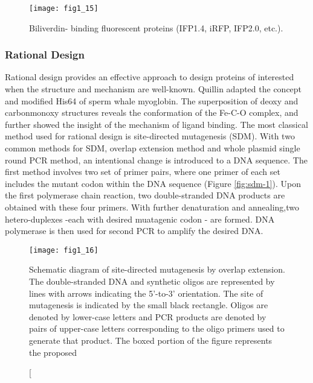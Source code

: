 \begin{refsection}
\begin{figure}[h!] \centering \texttt{[image: fig1\_15]}
    \caption[Biliverdin- binding fluorescent proteins (IFP1.4, iRFP, IFP2.0,
    etc.).]{Biliverdin- binding fluorescent proteins (IFP1.4, iRFP, IFP2.0,
        etc.)\cite{Kazlauskas2005}.} \label{fig:protein-engineering-example} 
\end{figure}

\subsubsection{Rational Design}
\label{sec:rational-design}

Rational design provides an effective approach to design proteins of interested
when the structure and mechanism are well-known. Quillin  adapted
the concept and modified His64 of sperm whale myoglobin. The superposition of
deoxy and carbonmonoxy structures reveals  the conformation of the Fe-C-O
complex, and further showed the insight of the mechanism of ligand
binding\cite{Quillin1993}. The most classical method used for rational design
is site-directed mutagenesis (SDM)\cite{Arnold1993}. With two common methods
for SDM, overlap extension method and whole plasmid single round PCR method, an
intentional change is introduced to a DNA sequence. The first method involves
two set of primer pairs, where one primer of each set includes the mutant codon
within the DNA sequence (Figure \ref{fig:sdm-1})\cite{Ho1989}. Upon the first
polymerase chain reaction, two double-stranded DNA products are obtained with
these four primers. With further denaturation and annealing,two hetero-duplexes
-each with desired muatagenic codon - are formed. DNA polymerase is then used
for second PCR to amplify the desired DNA\cite{Ho1989}. 
\begin{figure}[h!] \centering \texttt{[image: fig1\_16]}
    \caption[Schematic diagram of site-directed mutagenesis by overlap
        extension. The double-stranded DNA and synthetic oligos are represented by lines
        with arrows indicating the 5’-to-3’ orientation. The site of
        mutagenesis is indicated by the small black rectangle. Oligos are
        denoted by lower-case letters and PCR products are denoted by pairs of
        upper-case letters corresponding to the oligo primers used to generate
        that product. The boxed portion of the figure represents the proposed

\end{figure}
\end{refsection}
